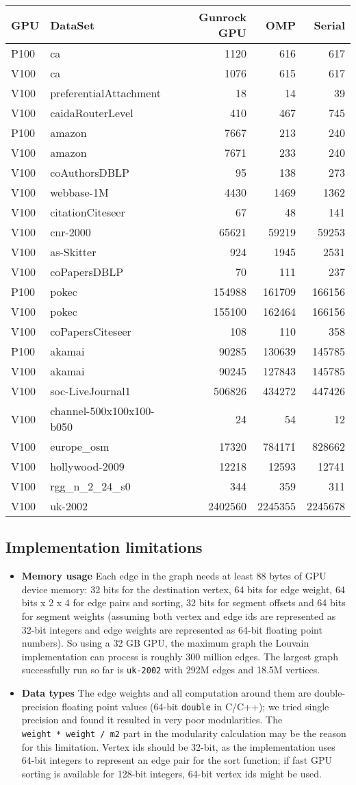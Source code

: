 \documentclass[10pt,oneside]{memoir}
\begin{document}
\begin{longtable}[]{@{}llrrr@{}}
\toprule
GPU & DataSet & Gunrock GPU & OMP & Serial\tabularnewline
\midrule
\endhead
P100 & ca & 1120 & 616 & 617\tabularnewline
V100 & ca & 1076 & 615 & 617\tabularnewline
V100 & preferentialAttachment & 18 & 14 & 39\tabularnewline
V100 & caidaRouterLevel & 410 & 467 & 745\tabularnewline
P100 & amazon & 7667 & 213 & 240\tabularnewline
V100 & amazon & 7671 & 233 & 240\tabularnewline
V100 & coAuthorsDBLP & 95 & 138 & 273\tabularnewline
V100 & webbase-1M & 4430 & 1469 & 1362\tabularnewline
V100 & citationCiteseer & 67 & 48 & 141\tabularnewline
V100 & cnr-2000 & 65621 & 59219 & 59253\tabularnewline
V100 & as-Skitter & 924 & 1945 & 2531\tabularnewline
V100 & coPapersDBLP & 70 & 111 & 237\tabularnewline
P100 & pokec & 154988 & 161709 & 166156\tabularnewline
V100 & pokec & 155100 & 162464 & 166156\tabularnewline
V100 & coPapersCiteseer & 108 & 110 & 358\tabularnewline
P100 & akamai & 90285 & 130639 & 145785\tabularnewline
V100 & akamai & 90245 & 127843 & 145785\tabularnewline
V100 & soc-LiveJournal1 & 506826 & 434272 & 447426\tabularnewline
V100 & channel-500x100x100-b050 & 24 & 54 & 12\tabularnewline
V100 & europe\_osm & 17320 & 784171 & 828662\tabularnewline
V100 & hollywood-2009 & 12218 & 12593 & 12741\tabularnewline
V100 & rgg\_n\_2\_24\_s0 & 344 & 359 & 311\tabularnewline
V100 & uk-2002 & 2402560 & 2245355 & 2245678\tabularnewline
\bottomrule
\end{longtable}

\hypertarget{implementation-limitations-4}{%
\subsection{Implementation
limitations}\label{implementation-limitations-4}}

\begin{itemize}
\item
  \textbf{Memory usage} Each edge in the graph needs at least 88 bytes
  of GPU device memory: 32 bits for the destination vertex, 64 bits for
  edge weight, 64 bits x 2 x 4 for edge pairs and sorting, 32 bits for
  segment offsets and 64 bits for segment weights (assuming both vertex
  and edge ids are represented as 32-bit integers and edge weights are
  represented as 64-bit floating point numbers). So using a 32 GB GPU,
  the maximum graph the Louvain implementation can process is roughly
  300 million edges. The largest graph successfully run so far is
  \texttt{uk-2002} with 292M edges and 18.5M vertices.
\item
  \textbf{Data types} The edge weights and all computation around them
  are double-precision floating point values (64-bit \texttt{double} in
  C/C++); we tried single precision and found it resulted in very poor
  modularities. The \texttt{weight\ *\ weight\ /\ m2} part in the
  modularity calculation may be the reason for this limitation. Vertex
  ids should be 32-bit, as the implementation uses 64-bit integers to
  represent an edge pair for the sort function; if fast GPU sorting is
  available for 128-bit integers, 64-bit vertex ids might be used.
\end{itemize}
\end{document}
